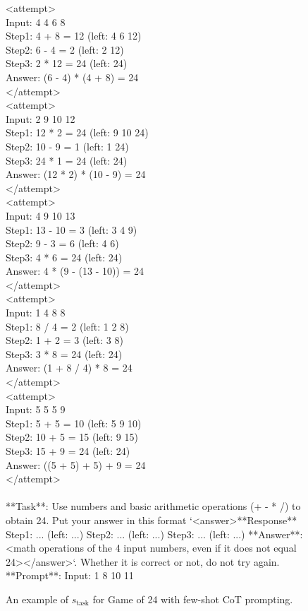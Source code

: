\documentclass{article}
\newcommand{\0}{\mathbf{0}}
\begin{document}
\begin{figure}
  \centering
  \begin{tcolorbox}[
      colback=gray!5!white,
      colframe=black!100!black,
      width=1\textwidth
  ]
  \small
    <attempt> \\
Input: 4 4 6 8 \\
Step1: 4 + 8 = 12 (left: 4 6 12) \\
Step2: 6 - 4 = 2 (left: 2 12) \\
Step3: 2 * 12 = 24 (left: 24) \\
Answer: (6 - 4) * (4 + 8) = 24 \\
</attempt> \\
<attempt> \\
Input: 2 9 10 12 \\
Step1: 12 * 2 = 24 (left: 9 10 24) \\
Step2: 10 - 9 = 1 (left: 1 24) \\
Step3: 24 * 1 = 24 (left: 24) \\
Answer: (12 * 2) * (10 - 9) = 24 \\
</attempt> \\
<attempt> \\
Input: 4 9 10 13 \\
Step1: 13 - 10 = 3 (left: 3 4 9) \\
Step2: 9 - 3 = 6 (left: 4 6) \\
Step3: 4 * 6 = 24 (left: 24) \\
Answer: 4 * (9 - (13 - 10)) = 24 \\
</attempt> \\
<attempt> \\
Input: 1 4 8 8 \\
Step1: 8 / 4 = 2 (left: 1 2 8) \\
Step2: 1 + 2 = 3 (left: 3 8) \\
Step3: 3 * 8 = 24 (left: 24) \\
Answer: (1 + 8 / 4) * 8 = 24 \\
</attempt> \\
<attempt> \\
Input: 5 5 5 9 \\
Step1: 5 + 5 = 10 (left: 5 9 10) \\
Step2: 10 + 5 = 15 (left: 9 15) \\
Step3: 15 + 9 = 24 (left: 24) \\
Answer: ((5 + 5) + 5) + 9 = 24 \\
</attempt> \\
\\
    **Task**: Use numbers and basic arithmetic operations (+ - * /) to obtain 24. Put your answer in this format `<answer>**Response** Step1: ... (left: ...) Step2: ... (left: ...) Step3: ... (left: ...) **Answer**: <math operations of the 4 input numbers, even if it does not equal 24></answer>`. Whether it is correct or not, do not try again. \\
    **Prompt**: Input: 1 8 10 11
  \end{tcolorbox}
  \caption{An example of $s_{\text{task}}$ for Game of 24 with few-shot CoT prompting.}
  \label{fig:s_task_game_24}
\end{figure}
\end{document}

